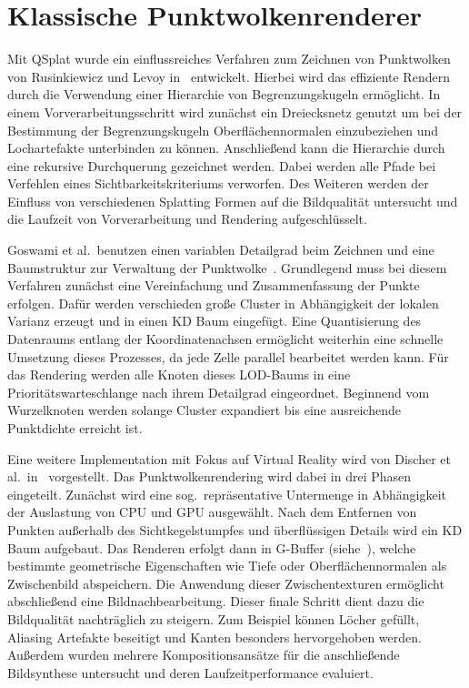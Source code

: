 \documentclass[hyperref, beleg, german]{cgvpub}
\begin{document}
\section{Klassische Punktwolkenrenderer}

Mit QSplat wurde ein einflussreiches Verfahren zum Zeichnen von Punktwolken von
Rusinkiewicz und Levoy in~\cite{rusinkiewicz2000qsplat} entwickelt. Hierbei
wird das effiziente Rendern durch die Verwendung einer Hierarchie von
Begrenzungskugeln ermöglicht. In einem Vorverarbeitungsschritt wird zunächst
ein Dreiecksnetz genutzt um bei der Bestimmung der Begrenzungskugeln
Oberflächennormalen einzubeziehen und Lochartefakte unterbinden zu können.
Anschließend kann die Hierarchie durch eine rekursive Durchquerung gezeichnet
werden. Dabei werden alle Pfade bei Verfehlen eines Sichtbarkeitskriteriums
verworfen. Des Weiteren werden der Einfluss von verschiedenen Splatting Formen
auf die Bildqualität untersucht und die Laufzeit von Vorverarbeitung und
Rendering aufgeschlüsselt.

Goswami et al.\ benutzen einen variablen Detailgrad beim Zeichnen und eine
Baumstruktur zur Verwaltung der Punktwolke~\cite{goswami2010high}. Grundlegend
muss bei diesem Verfahren zunächst eine Vereinfachung und Zusammenfassung der
Punkte erfolgen. Dafür werden verschieden große Cluster in Abhängigkeit der
lokalen Varianz erzeugt und in einen KD Baum eingefügt. Eine Quantisierung des
Datenraums entlang der Koordinatenachsen ermöglicht weiterhin eine schnelle
Umsetzung dieses Prozesses, da jede Zelle parallel bearbeitet werden kann. Für
das Rendering werden alle Knoten dieses LOD-Baums in eine
Prioritätswarteschlange nach ihrem Detailgrad eingeordnet. Beginnend vom
Wurzelknoten werden solange Cluster expandiert bis eine ausreichende
Punktdichte erreicht ist.

Eine weitere Implementation mit Fokus auf Virtual Reality wird von Discher et
al.\ in~\cite{discher2018point} vorgestellt. Das Punktwolkenrendering wird
dabei in drei Phasen eingeteilt. Zunächst wird eine sog.\ repräsentative
Untermenge in Abhängigkeit der Auslastung von CPU und GPU ausgewählt. Nach dem
Entfernen von Punkten außerhalb des Sichtkegelstumpfes und überflüssigen
Details wird ein KD Baum aufgebaut. Das Renderen erfolgt dann in G-Buffer
(siehe~\cite{saito1990comprehensible}), welche bestimmte geometrische
Eigenschaften wie Tiefe oder Oberflächennormalen als Zwischenbild abspeichern.
Die Anwendung dieser Zwischentexturen ermöglicht abschließend eine
Bildnachbearbeitung. Dieser finale Schritt dient dazu die Bildqualität
nachträglich zu steigern. Zum Beispiel können Löcher gefüllt, Aliasing
Artefakte beseitigt und Kanten besonders hervorgehoben werden. Außerdem wurden
mehrere Kompositionsansätze für die anschließende Bildsynthese untersucht und
deren Laufzeitperformance evaluiert.
\end{document}
